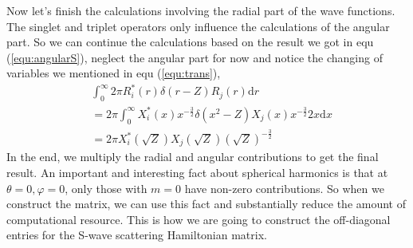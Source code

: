 \documentclass[british,english]{article}
\numberwithin{equation}{section}
\numberwithin{figure}{section}
\begin{document}
Now let's finish the calculations involving the radial part of the wave functions. The singlet and triplet operators only influence the calculations of the angular part. So we can continue the calculations based on the result we got in equ (\ref{equ:angularS}), neglect the angular part for now and  notice the changing of variables we mentioned in equ (\ref{equ:trans}),
\begin{equation}
\begin{aligned}
&\int_0^{\infty} 2\pi R^*_i( r)\delta(r - Z)R_j(r)\mathrm dr\\
&= 2\pi \int_0^{\infty} X^*_i(x)x^{-\frac{3}{2}}\delta(x^2-Z)X_j(x)x^{-\frac{3}{2}}2x\mathrm dx\\
&= 2\pi X_i^*(\sqrt{Z})X_j(\sqrt{Z})(\sqrt{Z})^{-\frac{3}{2}}
\end{aligned}
\end{equation}
In the end, we multiply the radial and angular contributions to get the final result. An important and interesting fact about spherical harmonics is that at $\theta=0, \varphi=0$, only those with $m=0$ have non-zero contributions. So when we construct the matrix, we can use this fact and substantially reduce the amount of computational resource. This is how we are going to construct the off-diagonal entries for the S-wave scattering Hamiltonian matrix.
\end{document}
